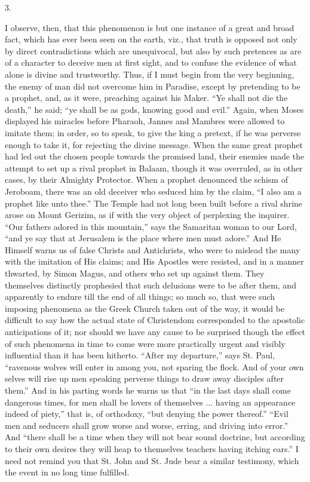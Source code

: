 3.

I observe, then, that this phenomenon is but one instance of a
great and broad fact, which has ever been seen on the earth, viz.,
that truth is opposed not only by direct contradictions which are
unequivocal, but also by such pretences as are of a character to
deceive men at first sight, and to confuse the evidence of what alone
is divine and trustworthy. Thus, if I must begin from the very
beginning, the enemy of man did not overcome him in Paradise, except
by pretending to be a prophet, and, as it were, preaching against his
Maker. ``Ye shall not die the death,'' he said; ``ye shall
be as gods, knowing good and evil.'' Again, when Moses displayed
his miracles before Pharaoh, Jannes and Mambres were allowed to
imitate them; in order, so to speak, to give the king a pretext, if he
was perverse enough to take it, for rejecting the divine message. When
the same great prophet had led out the chosen people towards the
promised land, their enemies made the attempt to set up a rival
prophet in Balaam, though it was overruled, as in other cases, by
their Almighty Protector. When a prophet denounced the schism of
Jeroboam, there was an old deceiver who seduced him by the claim,
``I also am a prophet like unto thee.'' The Temple had not
long been built before a rival shrine arose on Mount Gerizim, as if
with the very object of perplexing the inquirer. ``Our fathers
adored in this mountain,'' says the Samaritan woman to our Lord,
``and ye say that at Jerusalem is the place where men must
adore.'' And He Himself warns us of false Christs and Antichrists,
who were to mislead the many with the imitation of His claims; and His
Apostles were resisted, and in a manner thwarted, by Simon Magus, and
others who set up against them. They themselves distinctly prophesied
that such delusions were to be after them, and apparently to endure
till the end of all things; so much so, that were such imposing
phenomena as the Greek Church taken out of the way, it would be
difficult to say how the actual state of Christendom corresponded to
the apostolic anticipations of it; nor should we have any cause to be
surprised though the effect of such phenomena in time to come were
more practically urgent and visibly influential than it has been
hitherto. ``After my departure,'' says St. Paul,
``ravenous wolves will enter in among you, not sparing the flock.
And of your own selves will rise up men speaking perverse things to
draw away disciples after them.'' And in his parting words he
warns us that ``in the last days shall come dangerous times, for
men shall be lovers of themselves ... having an appearance indeed of
piety,'' that is, of orthodoxy, ``but denying the power
thereof.'' ``Evil men and seducers shall grow worse and worse,
erring, and driving into error.'' And ``there shall be a time
when they will not bear sound doctrine, but according to their own
desires they will heap to themselves teachers having itching
ears.'' I need not remind you that St. John and St. Jude bear a
similar testimony, which the event in no long time fulfilled.

